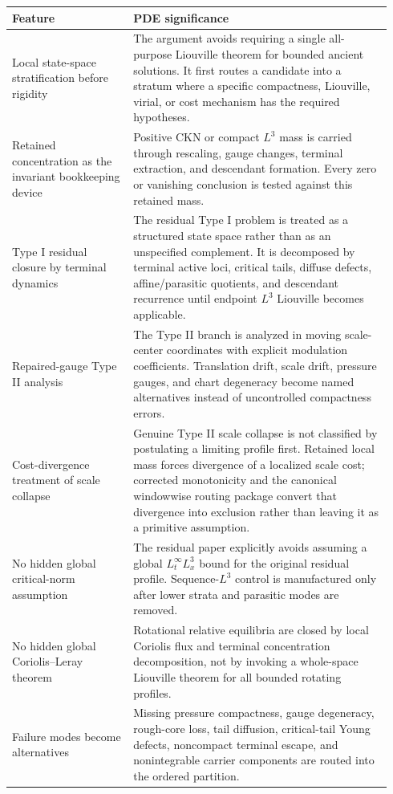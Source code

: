 \documentclass[11pt]{amsart}
\begin{document}
\begin{longtable}{@{}>{\raggedright\arraybackslash}p{0.30\linewidth}>{\raggedright\arraybackslash}p{0.64\linewidth}@{}}
\toprule
\textbf{Feature} & \textbf{PDE significance} \\
\midrule
\endhead
Local state-space stratification before rigidity & The argument avoids requiring a single all-purpose Liouville theorem for bounded ancient solutions.  It first routes a candidate into a stratum where a specific compactness, Liouville, virial, or cost mechanism has the required hypotheses. \\
Retained concentration as the invariant bookkeeping device & Positive CKN or compact \(L^3\) mass is carried through rescaling, gauge changes, terminal extraction, and descendant formation.  Every zero or vanishing conclusion is tested against this retained mass. \\
Type I residual closure by terminal dynamics & The residual Type I problem is treated as a structured state space rather than as an unspecified complement.  It is decomposed by terminal active loci, critical tails, diffuse defects, affine/parasitic quotients, and descendant recurrence until endpoint \(L^3\) Liouville becomes applicable. \\
Repaired-gauge Type II analysis & The Type II branch is analyzed in moving scale-center coordinates with explicit modulation coefficients.  Translation drift, scale drift, pressure gauges, and chart degeneracy become named alternatives instead of uncontrolled compactness errors. \\
Cost-divergence treatment of scale collapse & Genuine Type II scale collapse is not classified by postulating a limiting profile first.  Retained local mass forces divergence of a localized scale cost; corrected monotonicity and the canonical windowwise routing package convert that divergence into exclusion rather than leaving it as a primitive assumption. \\
No hidden global critical-norm assumption & The residual paper explicitly avoids assuming a global \(L^\infty_tL^3_x\) bound for the original residual profile.  Sequence-\(L^3\) control is manufactured only after lower strata and parasitic modes are removed. \\
No hidden global Coriolis--Leray theorem & Rotational relative equilibria are closed by local Coriolis flux and terminal concentration decomposition, not by invoking a whole-space Liouville theorem for all bounded rotating profiles. \\
Failure modes become alternatives & Missing pressure compactness, gauge degeneracy, rough-core loss, tail diffusion, critical-tail Young defects, noncompact terminal escape, and nonintegrable carrier components are routed into the ordered partition. \\
\bottomrule
\end{longtable}
\end{document}
